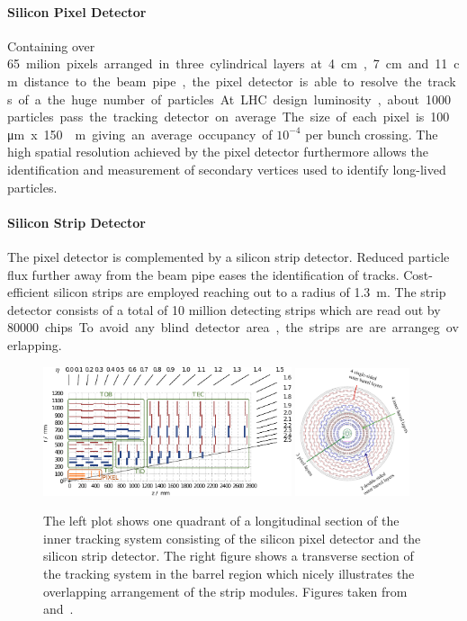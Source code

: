 \paragraph{Silicon Pixel Detector} Containing over \SI{65} milion pixels
arranged in three cylindrical layers at \SI{4}{\centi\meter},
\SI{7}{\centi\meter} and \SI{11}{\centi\meter} distance to the beam pipe, the
pixel detector is able to resolve the tracks of a the huge number of particles. At
LHC design luminosity, about 1000 particles pass the tracking detector on
average. The size of each pixel is \SI{100}{\micro \meter} x \SI{150}{\micro
\meter} giving an average occupancy of $10^{-4}$ per bunch crossing. The high
spatial resolution achieved by the pixel detector furthermore allows the
identification and measurement of secondary vertices used to identify long-lived
particles.

\paragraph{Silicon Strip Detector} The pixel detector is complemented by a silicon
strip detector. Reduced particle flux further away from the beam pipe eases the identification
of tracks. Cost-efficient silicon strips are employed reaching out to
a radius of \SI{1.3}{\meter}. The strip detector consists of a total of 10 million
detecting strips which are read out by \SI{80000} chips. To avoid any blind
detector area, the strips are are arrangeg overlapping.

\begin{figure}[htp]
    \centering
    \includegraphics[width=0.65\textwidth]{figures/cms_detector/tracker.pdf}\hfill
    \includegraphics[width=0.3\textwidth]{figures/cms_detector/tracking_sytem_barrel_slice.png}
    \caption[Inner Tracking System]{The left plot shows one quadrant of a
        longitudinal section of the inner tracking system consisting of the
        silicon pixel detector and the silicon strip detector. The right figure shows a
        transverse section of the tracking system in the barrel region which
        nicely illustrates the overlapping arrangement of the strip modules. Figures taken
        from~\cite{Berger:2014aca} and~\cite{cmsweb:innertracker}.}
    \label{fig:cms:inner_tracking}
\end{figure}


